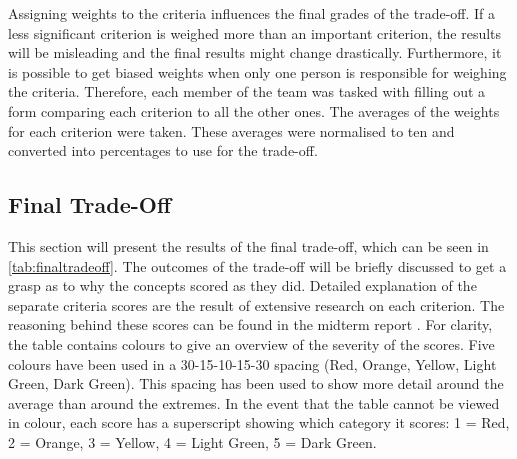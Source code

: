 Assigning weights to the criteria influences the final grades of the trade-off. If a less significant criterion is weighed more than an important criterion, the results will be misleading and the final results might change drastically. Furthermore, it is possible to get biased weights when only one person is responsible for weighing the criteria. Therefore, each member of the team was tasked with filling out a form comparing each criterion to all the other ones. The averages of the weights for each criterion were taken. These averages were normalised to ten and converted into percentages to use for the trade-off. 


\subsection{Final Trade-Off}
\label{sec:fina_trad}

This section will present the results of the final trade-off, which can be seen in \autoref{tab:finaltradeoff}. The outcomes of the trade-off will be briefly discussed to get a grasp as to why the concepts scored as they did. Detailed explanation of the separate criteria scores are the result of extensive research on each criterion. The reasoning behind these scores can be found in the midterm report \cite{midterm}. For clarity, the table contains colours to give an overview of the severity of the scores. Five colours have been used in a 30-15-10-15-30 spacing (Red, Orange, Yellow, Light Green, Dark Green). This spacing has been used to show more detail around the average than around the extremes. In the event that the table cannot be viewed in colour, each score has a superscript showing which category it scores: 1 = Red, 2 = Orange, 3 = Yellow, 4 = Light Green, 5 = Dark Green. 

